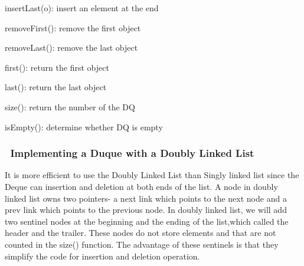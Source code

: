 \documentclass[twocolumn,10pt]{jarticle}
\begin{document}
insertLast(o): insert an element at the end 

removeFirst(): remove the first object 

removeLast(): remove the last object

first(): return the first object 

last(): return the last object

size(): return the number of the DQ

isEmpty(): determine whether DQ is empty
\subsubsection{\ Implementing a Duque with a Doubly Linked List}
It is more efficient to use the Doubly Linked List than Singly linked list since the Deque can insertion and deletion at both ends of the list. A node in doubly linked list owns two pointers- a next link which points to the next node and a prev link which points to the previous node. In doubly linked list, we will add two sentinel nodes at the beginning and the ending of the list,which called the header and the trailer. These nodes do not store elements and that are not counted in the size() function. The advantage of these sentinels is that they simplify the code for insertion and deletion operation.
\end{document}
